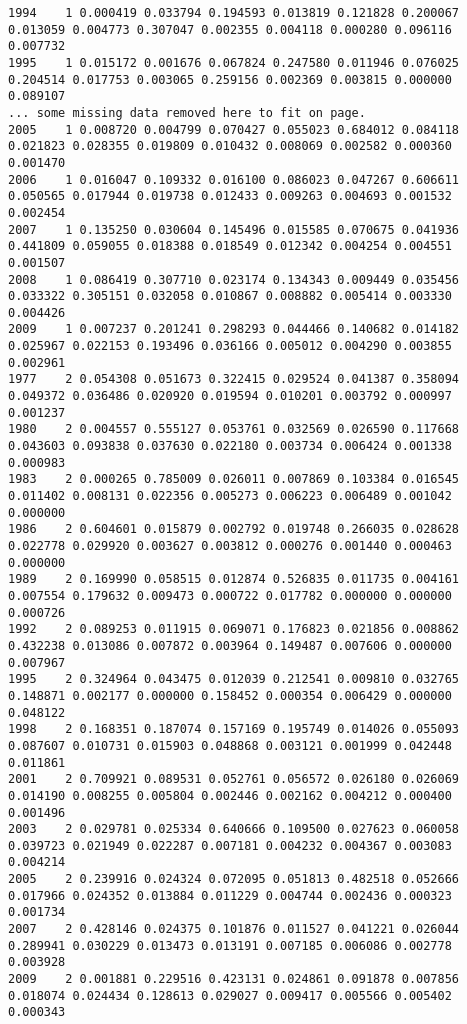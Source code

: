 \begin{landscape}
\begin{footnotesize}
\begin{verbatim}
1994    1 0.000419 0.033794 0.194593 0.013819 0.121828 0.200067 0.013059 0.004773 0.307047 0.002355 0.004118 0.000280 0.096116 0.007732
1995    1 0.015172 0.001676 0.067824 0.247580 0.011946 0.076025 0.204514 0.017753 0.003065 0.259156 0.002369 0.003815 0.000000 0.089107
...	some missing data removed here to fit on page.
2005    1 0.008720 0.004799 0.070427 0.055023 0.684012 0.084118 0.021823 0.028355 0.019809 0.010432 0.008069 0.002582 0.000360 0.001470
2006    1 0.016047 0.109332 0.016100 0.086023 0.047267 0.606611 0.050565 0.017944 0.019738 0.012433 0.009263 0.004693 0.001532 0.002454
2007    1 0.135250 0.030604 0.145496 0.015585 0.070675 0.041936 0.441809 0.059055 0.018388 0.018549 0.012342 0.004254 0.004551 0.001507
2008    1 0.086419 0.307710 0.023174 0.134343 0.009449 0.035456 0.033322 0.305151 0.032058 0.010867 0.008882 0.005414 0.003330 0.004426
2009    1 0.007237 0.201241 0.298293 0.044466 0.140682 0.014182 0.025967 0.022153 0.193496 0.036166 0.005012 0.004290 0.003855 0.002961
1977    2 0.054308 0.051673 0.322415 0.029524 0.041387 0.358094 0.049372 0.036486 0.020920 0.019594 0.010201 0.003792 0.000997 0.001237
1980    2 0.004557 0.555127 0.053761 0.032569 0.026590 0.117668 0.043603 0.093838 0.037630 0.022180 0.003734 0.006424 0.001338 0.000983
1983    2 0.000265 0.785009 0.026011 0.007869 0.103384 0.016545 0.011402 0.008131 0.022356 0.005273 0.006223 0.006489 0.001042 0.000000
1986    2 0.604601 0.015879 0.002792 0.019748 0.266035 0.028628 0.022778 0.029920 0.003627 0.003812 0.000276 0.001440 0.000463 0.000000
1989    2 0.169990 0.058515 0.012874 0.526835 0.011735 0.004161 0.007554 0.179632 0.009473 0.000722 0.017782 0.000000 0.000000 0.000726
1992    2 0.089253 0.011915 0.069071 0.176823 0.021856 0.008862 0.432238 0.013086 0.007872 0.003964 0.149487 0.007606 0.000000 0.007967
1995    2 0.324964 0.043475 0.012039 0.212541 0.009810 0.032765 0.148871 0.002177 0.000000 0.158452 0.000354 0.006429 0.000000 0.048122
1998    2 0.168351 0.187074 0.157169 0.195749 0.014026 0.055093 0.087607 0.010731 0.015903 0.048868 0.003121 0.001999 0.042448 0.011861
2001    2 0.709921 0.089531 0.052761 0.056572 0.026180 0.026069 0.014190 0.008255 0.005804 0.002446 0.002162 0.004212 0.000400 0.001496
2003    2 0.029781 0.025334 0.640666 0.109500 0.027623 0.060058 0.039723 0.021949 0.022287 0.007181 0.004232 0.004367 0.003083 0.004214
2005    2 0.239916 0.024324 0.072095 0.051813 0.482518 0.052666 0.017966 0.024352 0.013884 0.011229 0.004744 0.002436 0.000323 0.001734
2007    2 0.428146 0.024375 0.101876 0.011527 0.041221 0.026044 0.289941 0.030229 0.013473 0.013191 0.007185 0.006086 0.002778 0.003928
2009    2 0.001881 0.229516 0.423131 0.024861 0.091878 0.007856 0.018074 0.024434 0.128613 0.029027 0.009417 0.005566 0.005402 0.000343
\end{verbatim}
\end{footnotesize}
\end{landscape}




